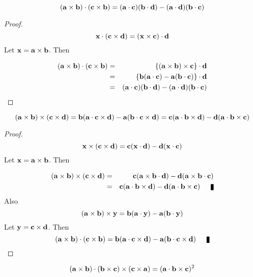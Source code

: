 \begin{theorem}
\[ ({\bf a} \times {\bf b}) \cdot ({\bf c} \times {\bf b}) = ({\bf a}\cdot {\bf c})({\bf b}\cdot {\bf d}) - ({\bf a}\cdot {\bf d})({\bf b}\cdot {\bf c}) \]
\end{theorem}

\begin{proof}
\[ {\bf x}\cdot ({\bf c}\times{\bf d}) = ({\bf x}\times {\bf c})\cdot{\bf d}\] Let ${\bf x} = {\bf a}\times{\bf b}$. Then 

\begin{eqnarray*}
({\bf a} \times {\bf b}) \cdot ({\bf c} \times {\bf b}) &=&\{({\bf a} \times {\bf b})  \times {\bf c}\} \cdot {\bf d} \\
&=& \{{\bf b}({\bf a}\cdot {\bf c}) - {\bf a}({\bf b}\cdot {\bf c}) \}\cdot {\bf d} \\
&=& ({\bf a}\cdot {\bf c})({\bf b}\cdot {\bf d}) - ({\bf a}\cdot {\bf d})({\bf b}\cdot {\bf c}) 
\end{eqnarray*} 
\end{proof}

\begin{theorem}
\[ ({\bf a} \times {\bf b}) \times ({\bf c} \times {\bf d}) = {\bf b}({\bf a}\cdot {\bf c}\times {\bf d}) - {\bf a}({\bf b}\cdot {\bf c}\times {\bf d}) =  {\bf c}({\bf a}\cdot {\bf b}\times {\bf d}) - {\bf d}({\bf a}\cdot {\bf b}\times {\bf c})\]
\end{theorem}
\begin{proof}
\[ {\bf x} \times ({\bf c} \times {\bf d}) = {\bf c}({\bf x}\cdot {\bf d}) - {\bf d}({\bf x}\cdot {\bf c}) \] Let ${\bf x} = {\bf a}\times {\bf b}$. Then 

\begin{eqnarray*}
({\bf a} \times {\bf b}) \times ({\bf c} \times {\bf d}) &=& {\bf c}({\bf a}\times {\bf b}\cdot {\bf d}) - {\bf d}({\bf a}\times {\bf b}\cdot {\bf c}) \\ 
 &=& {\bf c}({\bf a}\cdot {\bf b}\times {\bf d}) - {\bf d}({\bf a}\cdot {\bf b}\times{\bf c})\qed
\end{eqnarray*}
Also 
\[ ({\bf a} \times {\bf b}) \times {\bf y}  = {\bf b}({\bf a}\cdot {\bf y}) - {\bf a}({\bf b}\cdot {\bf y}) \] Let ${\bf y} = {\bf c}\times {\bf d}$. Then 
\[({\bf a} \times {\bf b}) \cdot ({\bf c} \times {\bf b}) ={\bf b}({\bf a}\cdot {\bf c}\times{\bf d}) - {\bf a}({\bf b}\cdot {\bf c}\times{\bf d})\qed\]
\end{proof}


\begin{theorem}
\[ ({\bf a} \times {\bf b})\cdot ({\bf b}\times {\bf c}) \times ({\bf c}\times {\bf a}) = ({\bf a}\cdot {\bf b} \times {\bf c})^2 \]
\end{theorem}

